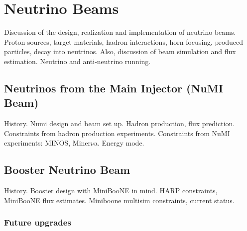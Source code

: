 \chapter{Neutrino Beams}

Discussion of the design, realization and implementation of neutrino beams.  Proton sources, target materials, hadron interactions, horn focusing, produced particles, decay into neutrinos.  Also, discussion of beam simulation and flux estimation.  Neutrino and anti-neutrino running.

\section{Neutrinos from the Main Injector (NuMI Beam)}

History. Numi design and beam set up.  Hadron production, flux prediction.  Constraints from hadron production experiments.  Constraints from NuMI experiments: MINOS, Miner$\nu$a.  Energy mode.

\section{Booster Neutrino Beam}

History.  Booster design with MiniBooNE in mind.  HARP constraints, MiniBooNE flux estimates.  Miniboone multisim constraints, current status.
\subsection{Future upgrades}
